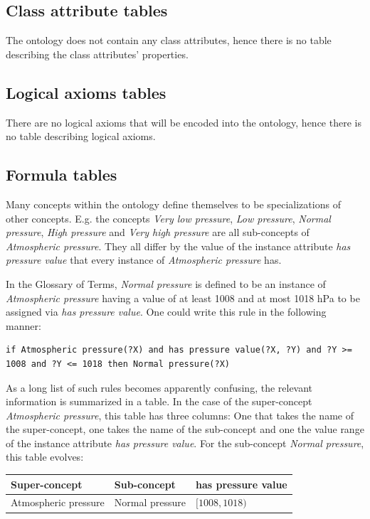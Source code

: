\subsection{Class attribute tables}

The ontology does not contain any class attributes, hence there is no table describing the class attributes' properties.

\subsection{Logical axioms tables}

There are no logical axioms that will be encoded into the ontology, hence there is no table describing logical axioms.

\subsection{Formula tables}

Many concepts within the \thinkhomeweather ontology define themselves to be specializations of other concepts. E.g. the concepts \emph{Very low pressure}, \emph{Low pressure}, \emph{Normal pressure}, \emph{High pressure} and \emph{Very high pressure} are all sub-concepts of \emph{Atmospheric pressure}. They all differ by the value of the instance attribute \emph{has pressure value} that every instance of \emph{Atmospheric pressure} has.

In the Glossary of Terms, \emph{Normal pressure} is defined to be an instance of \emph{Atmospheric pressure} having a value of at least 1008 and at most 1018 hPa to be assigned via \emph{has pressure value}. One could write this rule in the following manner:

\begin{verbatim}
if Atmospheric pressure(?X) and has pressure value(?X, ?Y) and ?Y >= 1008 and ?Y <= 1018 then Normal pressure(?X)
\end{verbatim}

As a long list of such rules becomes apparently confusing, the relevant information is summarized in a table. In the case of the super-concept \emph{Atmospheric pressure}, this table has three columns: One that takes the name of the super-concept, one takes the name of the sub-concept and one the value range of the instance attribute \emph{has pressure value}. For the sub-concept \emph{Normal pressure}, this table evolves:

\begin{longtable}{|p{}|p{}|p{}|}
  \hline
  \textbf{Super-concept} & \textbf{Sub-concept} & \textbf{has pressure value} \\
  \hline\hline
  Atmospheric pressure & Normal pressure & $[1008, 1018)$ \\
  \hline
\end{longtable}

